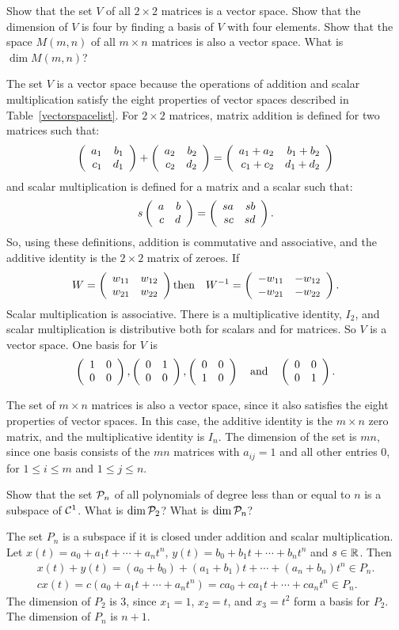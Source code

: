 \documentclass{ximera}
\begin{document}
\begin{exercise} \label{c5.5.4}
Show that the set $V$ of all $2\times 2$ matrices is a vector space.
Show that the dimension of $V$ is four by finding a basis of $V$
with four elements.  Show that the space $M(m,n)$ of all $m\times n$
matrices is also a vector space.  What is $\dim M(m,n)$?

\begin{solution}

The set $V$ is a vector space because the operations of addition and
scalar multiplication satisfy the eight properties of
vector spaces described in Table~\ref{vectorspacelist}.  For $2 \times
2$ matrices, matrix addition is defined for two matrices such that:
\[
\left(\begin{array}{rr} a_1 & b_1\\ c_1 &d_1\end{array}\right) + \left(\begin{array}{rr} a_2 & b_2\\ c_2 &d_2\end{array}\right) =
\left(\begin{array}{rr} a_1 + a_2 & b_1 + b_2\\ c_1 + c_2 &d_1 + d_2\end{array}\right)
\]
and scalar multiplication is defined for a matrix and a scalar such that:
\[
s\left(\begin{array}{rr} a & b\\ c &d\end{array}\right) = \left(\begin{array}{rr} sa & sb\\ sc &sd\end{array}\right).
\]
So, using these definitions, addition is commutative and associative,
and the additive identity is the $2 \times 2$ matrix of zeroes.  If
\[
W = \left(\begin{array}{rr} w_{11} & w_{12}\\ w_{21} &w_{22}\end{array}\right) \mbox{then}
\quad W^{-1} = \left(\begin{array}{rr} -w_{11} & -w_{12}\\ -w_{21} &-w_{22}\end{array}\right).
\]
Scalar multiplication is associative.  There is a multiplicative
identity, $I_2$, and scalar multiplication is distributive both
for scalars and for matrices.  So $V$ is a vector space.  One basis
for $V$ is
\[
\left(\begin{array}{rr} 1 & 0\\ 0 &0\end{array}\right), \left(\begin{array}{rr} 0 & 1\\ 0 &0\end{array}\right), \left(\begin{array}{rr} 0 & 0\\ 1 &0\end{array}\right)
\quad\mbox{and}\quad \left(\begin{array}{rr} 0 & 0\\ 0 &1\end{array}\right).
\]

\para The set of $m \times n$ matrices is also a vector space, since
it also satisfies the eight properties of vector spaces.  In this
case, the additive identity is the $m \times n$ zero matrix, and
the multiplicative identity is $I_n$.  The dimension of the set is
$mn$, since one basis consists of the $mn$ matrices with $a_{ij}
= 1$ and all other entries $0$, for $1 \leq i \leq m$ and $1 \leq j
\leq n$.

\end{solution}
\end{exercise}

\begin{exercise} \label{c5.5.5}
Show that the set ${\cal P}_n$ of all polynomials of degree less than
or equal to $n$ is a subspace of ${\cal C}^1$.  What is $\dim {\cal P}_2$?
What is $\dim {\cal P}_n$?

\begin{solution}

The set $P_n$ is a subspace if it is closed under addition and
scalar multiplication.  Let $x(t) = a_0 + a_1t + \cdots +
a_nt^n$, $y(t) = b_0 + b_1t + \cdots + b_nt^n$ and $s \in \mbox{$\Bbb{R}$}$.
Then
\[
\begin{array}{l}
x(t) + y(t) = (a_0 + b_0) + (a_1 + b_1)t + \cdots + (a_n + b_n)t^n \in P_n.
\\
cx(t) = c(a_0 + a_1t + \cdots + a_nt^n) = ca_0 + ca_1t + \cdots + ca_nt^n
\in P_n.
\end{array}
\]
The dimension of $P_2$ is 3, since $x_1 = 1$, $x_2 = t$, and
$x_3 = t^2$ form a basis for $P_2$.  The dimension of $P_n$ is
$n + 1$.

\end{solution}
\end{exercise}
\end{document}
